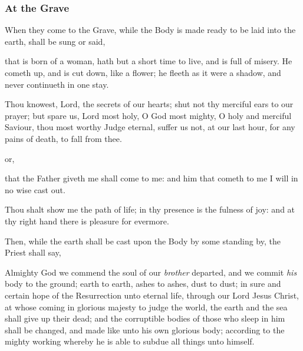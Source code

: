 \subsubsection{At the Grave}
\begin{rubric}
    When they come to the Grave, while the Body is made ready to be laid into the earth, shall be sung or said,
\end{rubric}\par

 that is born of a woman, hath but a short time to live, and is full of misery. He cometh up, and is cut down, like a flower; he fleeth as it were a shadow, and never continueth in one stay.\par
{}
    Thou knowest, Lord, the secrets of our hearts; shut not thy merciful ears to our prayer; but spare us, Lord most holy, O God most mighty, O holy and merciful Saviour, thou most worthy Judge eternal, suffer us not, at our last hour, for any pains of death, to fall from thee.
\begin{inhead}
    or,
\end{inhead}
 that the Father giveth me shall come to me: and him that cometh to me I will in no wise cast out.\par
    Thou shalt show me the path of life; in thy presence is the fulness of joy: and at thy right hand there is pleasure for evermore.

\begin{rubric}
    Then, while the earth shall be cast upon the Body by some standing by, the Priest shall say,
\end{rubric}

 Almighty God we commend the soul of our \textit{brother} departed, and we commit \textit{his} body to the ground; earth to earth, ashes to ashes, dust to dust; in sure and certain hope of the Resurrection unto eternal life, through our Lord Jesus Christ, at whose coming in glorious majesty to judge the world, the earth and the sea shall give up their dead; and the corruptible bodies of those who sleep in him shall be changed, and made like unto his own glorious body; according to the mighty working whereby he is able to subdue all things unto himself.


